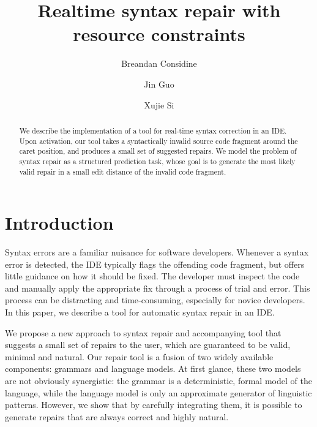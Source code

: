 \documentclass[runningheads]{llncs}
\begin{document}
%
\title{Realtime syntax repair with resource constraints}
%
%
\author{Breandan Considine \and
Jin Guo\and
Xujie Si}
%
%
%
\maketitle              %
%
\begin{abstract}
  We describe the implementation of a tool for real-time syntax correction in an IDE. Upon activation, our tool takes a syntactically invalid source code fragment around the caret position, and produces a small set of suggested repairs. We model the problem of syntax repair as a structured prediction task, whose goal is to generate the most likely valid repair in a small edit distance of the invalid code fragment.
\end{abstract}

\section{Introduction}

Syntax errors are a familiar nuisance for software developers. Whenever a syntax error is detected, the IDE typically flags the offending code fragment, but offers little guidance on how it should be fixed. The developer must inspect the code and manually apply the appropriate fix through a process of trial and error. This process can be distracting and time-consuming, especially for novice developers. In this paper, we describe a tool for automatic syntax repair in an IDE.

We propose a new approach to syntax repair and accompanying tool that suggests a small set of repairs to the user, which are guaranteed to be valid, minimal and natural. Our repair tool is a fusion of two widely available components: grammars and language models. At first glance, these two models are not obviously synergistic: the grammar is a deterministic, formal model of the language, while the language model is only an approximate generator of linguistic patterns. However, we show that by carefully integrating them, it is possible to generate repairs that are always correct and highly natural.
\end{document}
